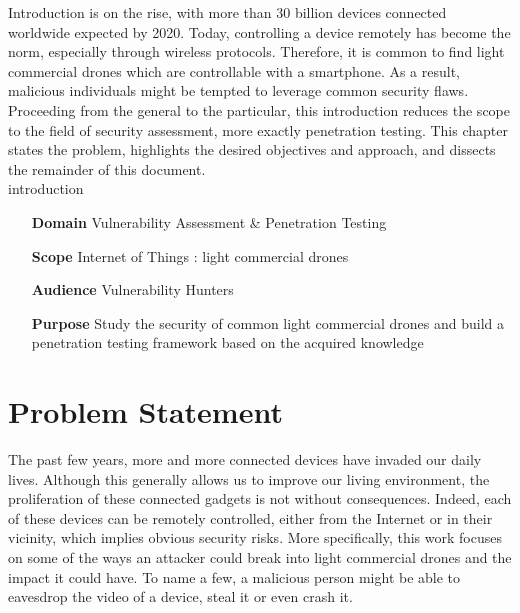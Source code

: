 \begin{chaptercover}{Introduction}%
{
{\large \hyphenation{}  is on the rise, with more than 30 billion devices connected worldwide expected by 2020. Today, controlling a device remotely has become the norm, especially through wireless protocols. Therefore, it is common to find light commercial drones which are controllable with a smartphone. As a result, malicious individuals might be tempted to leverage common security flaws. \newline \\ Proceeding from the general to the particular, this introduction reduces the scope to the field of security assessment, more exactly penetration testing. This chapter states the problem, highlights the desired objectives and approach, and dissects the remainder of this document.\newline\\}}%
{introduction}

\begin{projectdata}
\begin{itemize}[labelsep=1cm]
  \item [\textbf{Domain}] Vulnerability Assessment \& Penetration Testing
  \item [\textbf{Scope}] Internet of Things : light commercial drones
  \item [\textbf{Audience}] Vulnerability Hunters
  \item [\textbf{Purpose}] Study the security of common light commercial drones and build a penetration testing framework based on the acquired knowledge
\end{itemize}
\end{projectdata}

\section{Problem Statement}
{
The past few years, more and more connected devices have invaded our daily lives. Although this generally allows us to improve our living environment, the proliferation of these connected gadgets is not without consequences. Indeed, each of these devices can be remotely controlled, either from the Internet or in their vicinity, which implies obvious security risks. More specifically, this work focuses on some of the ways an attacker could break into light commercial drones and the impact it could have. To name a few, a malicious person might be able to eavesdrop the video of a device, steal it or even crash it.}


\end{chaptercover}
